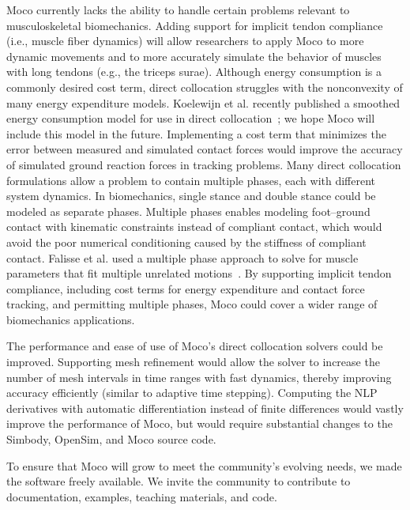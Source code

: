 \documentclass[10pt,letterpaper]{article}
\begin{document}
Moco currently lacks the ability to handle certain problems relevant to musculoskeletal biomechanics. Adding support for implicit tendon compliance (i.e., muscle fiber dynamics) will allow researchers to apply Moco to more dynamic movements and to more accurately simulate the behavior of muscles with long tendons (e.g., the triceps surae). Although energy consumption is a commonly desired cost term, direct collocation struggles with the nonconvexity of many energy expenditure models. Koelewijn et al. recently published a smoothed energy consumption model for use in direct collocation~\cite{Koelewijn:2019}; we hope Moco will include this model in the future. Implementing a cost term that minimizes the error between measured and simulated contact forces would improve the accuracy of simulated ground reaction forces in tracking problems. Many direct collocation formulations allow a problem to contain multiple phases, each with different system dynamics. In biomechanics, single stance and double stance could be modeled as separate phases. Multiple phases enables modeling foot–ground contact with kinematic constraints instead of compliant contact, which would avoid the poor numerical conditioning caused by the stiffness of compliant contact. Falisse et al. used a multiple phase approach to solve for muscle parameters that fit multiple unrelated motions~\cite{Falisse:2016}. By supporting implicit tendon compliance, including cost terms for energy expenditure and contact force tracking, and permitting multiple phases, Moco could cover a wider range of biomechanics applications.

The performance and ease of use of Moco’s direct collocation solvers could be improved. Supporting mesh refinement would allow the solver to increase the number of mesh intervals in time ranges with fast dynamics, thereby improving accuracy efficiently (similar to adaptive time stepping). Computing the NLP derivatives with automatic differentiation instead of finite differences would vastly improve the performance of Moco, but would require substantial changes to the Simbody, OpenSim, and Moco source code.

To ensure that Moco will grow to meet the community’s evolving needs, we made the software freely available. We invite the community to contribute to documentation, examples, teaching materials, and code.

\end{document}
